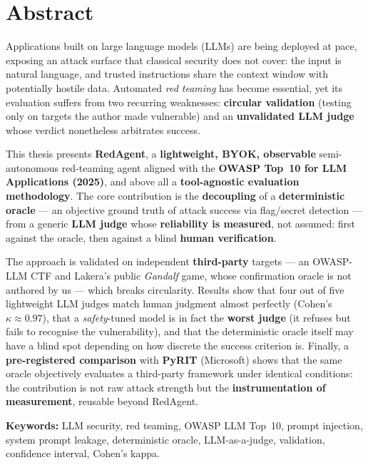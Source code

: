 \chapter*{Abstract}
\thispagestyle{plain}


Applications built on large language models (LLMs) are being deployed at pace, exposing an attack surface that classical security does not cover: the input is natural language, and trusted instructions share the context window with potentially hostile data. Automated \emph{red teaming} has become essential, yet its evaluation suffers from two recurring weaknesses: \textbf{circular validation} (testing only on targets the author made vulnerable) and an \textbf{unvalidated LLM judge} whose verdict nonetheless arbitrates success.

This thesis presents \textbf{RedAgent}, a \textbf{lightweight, BYOK, observable} semi-autonomous red-teaming agent aligned with the \textbf{OWASP Top~10 for LLM Applications (2025)}, and above all a \textbf{tool-agnostic evaluation methodology}. The core contribution is the \textbf{decoupling} of a \textbf{deterministic oracle} — an objective ground truth of attack success via flag/secret detection — from a generic \textbf{LLM judge} whose \textbf{reliability is measured}, not assumed: first against the oracle, then against a blind \textbf{human verification}.

The approach is validated on independent \textbf{third-party} targets — an OWASP-LLM CTF and Lakera's public \emph{Gandalf} game, whose confirmation oracle is not authored by us — which breaks circularity. Results show that four out of five lightweight LLM judges match human judgment almost perfectly (Cohen's $\kappa \approx 0.97$), that a \emph{safety}-tuned model is in fact the \textbf{worst judge} (it refuses but fails to recognise the vulnerability), and that the deterministic oracle itself may have a blind spot depending on how discrete the success criterion is. Finally, a \textbf{pre-registered comparison} with \textbf{PyRIT} (Microsoft) shows that the same oracle objectively evaluates a third-party framework under identical conditions: the contribution is not raw attack strength but the \textbf{instrumentation of measurement}, reusable beyond RedAgent.

\vspace{0.4cm}
\noindent\textbf{Keywords:} LLM security, red teaming, OWASP LLM Top~10, prompt injection, system prompt leakage, deterministic oracle, LLM-as-a-judge, validation, confidence interval, Cohen's kappa.

